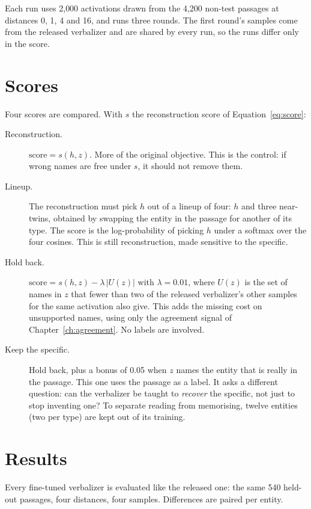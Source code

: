 Each run uses 2{,}000 activations drawn from the 4{,}200 non-test passages at distances 0, 1, 4 and 16, and
runs three rounds. The first round's samples come from the released verbalizer and are shared by every run,
so the runs differ only in the score.

\section{Scores}

Four scores are compared. With $s$ the reconstruction score of Equation~\ref{eq:score}:

\begin{description}
\item[Reconstruction.] $\mathrm{score} = s(h,z)$. More of the original objective. This is the control: if
wrong names are free under $s$, it should not remove them.
\item[Lineup.] The reconstruction must pick $h$ out of a lineup of four: $h$ and three near-twins, obtained
by swapping the entity in the passage for another of its type. The score is the log-probability of picking
$h$ under a softmax over the four cosines. This is still reconstruction, made sensitive to the specific.
\item[Hold back.] $\mathrm{score} = s(h,z) - \lambda\,|U(z)|$ with $\lambda = 0.01$, where $U(z)$ is the set of
names in $z$ that fewer than two of the released verbalizer's other samples for the same activation also
give. This adds the missing cost on unsupported names, using only the agreement signal of
Chapter~\ref{ch:agreement}. No labels are involved.
\item[Keep the specific.] Hold back, plus a bonus of 0.05 when $z$ names the entity that is really in the
passage. This one uses the passage as a label. It asks a different question: can the verbalizer be taught to
\emph{recover} the specific, not just to stop inventing one? To separate reading from memorising, twelve
entities (two per type) are kept out of its training.
\end{description}

\section{Results}

Every fine-tuned verbalizer is evaluated like the released one: the same 540 held-out passages, four
distances, four samples. Differences are paired per entity.

